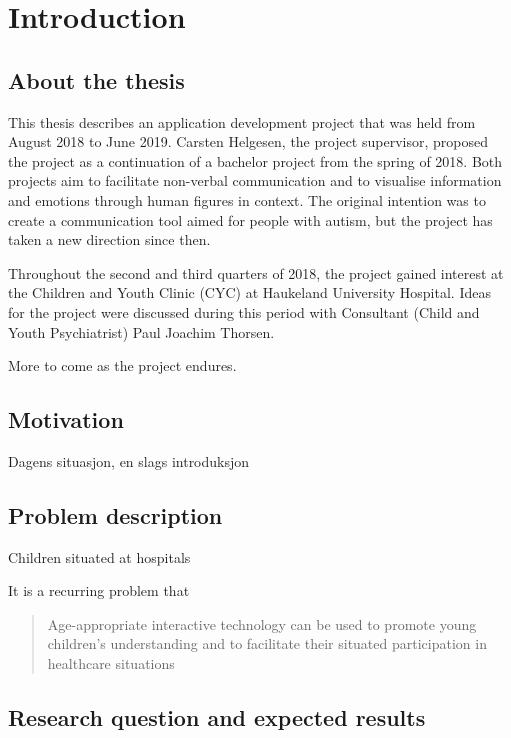 \chapter{Introduction}
\label{ch:introduction}

\section{About the thesis}

This thesis describes an application development project that was held from August 2018 to June 2019. Carsten Helgesen, the project supervisor, proposed the project as a continuation of a bachelor project from the spring of 2018. Both projects aim to facilitate non-verbal communication and to visualise information and emotions through human figures in context. The original intention was to create a communication tool aimed for people with autism, but the project has taken a new direction since then.

Throughout the second and third quarters of 2018, the project gained interest at the Children and Youth Clinic (CYC) at Haukeland University Hospital. Ideas for the project were discussed during this period with Consultant (Child and Youth Psychiatrist) Paul Joachim Thorsen.

More to come as the project endures.

\section{Motivation}

Dagens situasjon, en slags introduksjon

\section{Problem description}

Children situated at hospitals

It is a recurring problem that 

\begin{quote}
    Age-appropriate interactive technology can be used to promote young children’s understanding and to facilitate their situated participation in healthcare situations \cite{stalberg2018}
\end{quote}




\section{Research question and expected results}

